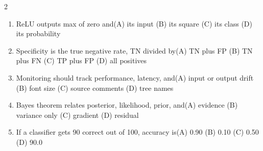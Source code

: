 \documentclass[a4paper]{article}
\begin{document}
\begin{multicols*}{2}
\begin{enumerate}[resume]
\item ReLU outputs max of zero and\newline\hspace*{0.6em}(A) its input \quad (B) its square \newline\hspace*{0.6em}(C) its class \quad (D) its probability
\item Specificity is the true negative rate, TN divided by\newline\hspace*{0.6em}(A) TN plus FP \quad (B) TN plus FN \newline\hspace*{0.6em}(C) TP plus FP \quad (D) all positives
\item Monitoring should track performance, latency, and\newline\hspace*{0.6em}(A) input or output drift \quad (B) font size \newline\hspace*{0.6em}(C) source comments \quad (D) tree names
\item Bayes theorem relates posterior, likelihood, prior, and\newline\hspace*{0.6em}(A) evidence \quad (B) variance only \newline\hspace*{0.6em}(C) gradient \quad (D) residual
\item If a classifier gets 90 correct out of 100, accuracy is\newline\hspace*{0.6em}(A) 0.90 \quad (B) 0.10 \newline\hspace*{0.6em}(C) 0.50 \quad (D) 90.0
\end{enumerate}
\end{multicols*}
\end{document}
